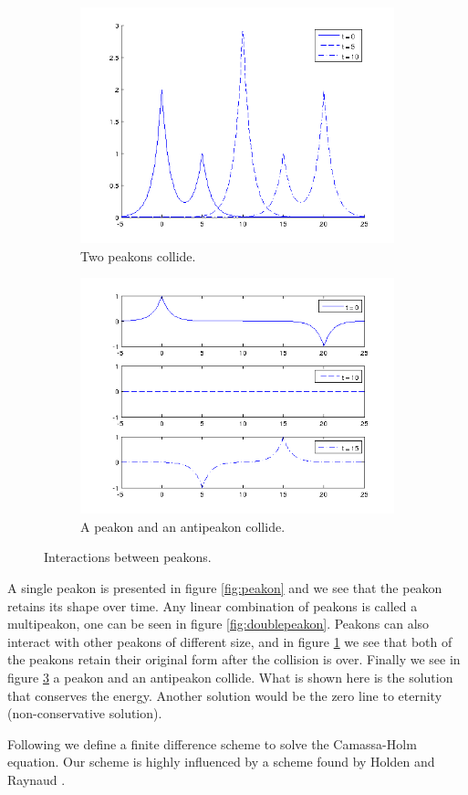 \begin{figure}[h]
\begin{subfigure}[b]{0.49\textwidth}
                \includegraphics[width=\textwidth]{gfx/peakonovertake}
                \caption{Two peakons collide.}
                \label{fig:peakonovertake}
        \end{subfigure}
        \begin{subfigure}[b]{0.49\textwidth}
                \includegraphics[width=\textwidth]{gfx/peakonantipeakon}
                \caption{A peakon and an antipeakon collide.}
                \label{fig:peakonantipeakon}
        \end{subfigure}
        \caption{Interactions between peakons.}
\end{figure}

A single peakon is presented in figure \ref{fig:peakon} and we see that the peakon retains its shape over time. Any linear combination of peakons is called a multipeakon, one can be seen in figure \ref{fig:doublepeakon}. Peakons can also interact with other peakons of different size, and in figure \ref{fig:peakonovertake} we see that both of the peakons retain their original form after the collision is over. Finally we see in figure \ref{fig:peakonantipeakon} a peakon and an antipeakon collide. What is shown here is the solution that conserves the energy. Another solution would be the zero line to eternity (non-conservative solution).

Following we define a finite difference scheme to solve the Camassa-Holm equation. Our scheme is highly influenced by a scheme found by Holden and Raynaud \cite{holden2006convergence}.
